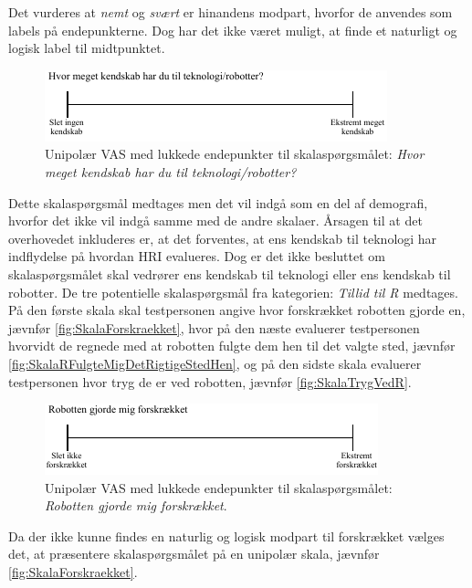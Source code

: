 \noindent
%
Det vurderes at \textit{nemt} og \textit{svært} er hinandens modpart, hvorfor de anvendes som labels på endepunkterne. Dog har det ikke været muligt, at finde et naturligt og logisk label til midtpunktet.
\newpage 
%
\begin{figure}[H]
\centering
\includegraphics[width =\textwidth]{Figure/UdvalgteSkalaer/KendskabTilTeknologi} 
\caption{Unipolær VAS med lukkede endepunkter til skalaspørgsmålet: \textit{Hvor meget kendskab har du til teknologi/robotter?}}
\label{fig:SkalaKendskabTilTeknologi}
\end{figure}
\noindent
%
Dette skalaspørgsmål medtages men det vil indgå som en del af demografi, hvorfor det ikke vil indgå samme med de andre skalaer. Årsagen til at det overhovedet inkluderes er, at det forventes, at ens kendskab til teknologi har indflydelse på hvordan HRI evalueres. Dog er det ikke besluttet om skalaspørgsmålet skal vedrører ens kendskab til teknologi eller ens kendskab til robotter. \blankline 
%
De tre potentielle skalaspørgsmål fra kategorien: \textit{Tillid til R} medtages. På den første skala skal testpersonen angive hvor forskrækket robotten gjorde en, jævnfør \autoref{fig:SkalaForskraekket}, hvor på den næste evaluerer testpersonen hvorvidt de regnede med at robotten fulgte dem hen til det valgte sted, jævnfør \autoref{fig:SkalaRFulgteMigDetRigtigeStedHen}, og på den sidste skala evaluerer testpersonen hvor tryg de er ved robotten, jævnfør \autoref{fig:SkalaTrygVedR}.
%
\begin{figure}[H]
\centering
\includegraphics[width =\textwidth]{Figure/UdvalgteSkalaer/Forskraekket} 
\caption{Unipolær VAS med lukkede endepunkter til skalaspørgsmålet: \textit{Robotten gjorde mig forskrækket}.}
\label{fig:SkalaForskraekket}
\end{figure}
\noindent
%
Da der ikke kunne findes en naturlig og logisk modpart til forskrækket vælges det, at præsentere skalaspørgsmålet på en unipolær skala, jævnfør \autoref{fig:SkalaForskraekket}. 
